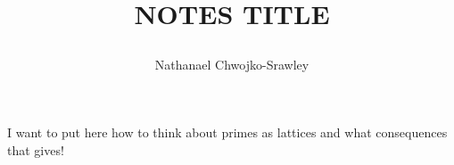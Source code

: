 \documentclass{book}
\title{
	\begin{huge}
		\bf{NOTES TITLE}
	\end{huge}
	}
\author{Nathanael Chwojko-Srawley}
\begin{document}
I want to put here how to think about primes as lattices and what consequences that gives!
\end{document}
